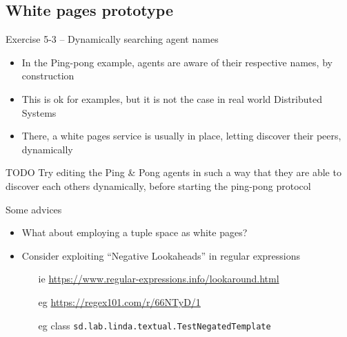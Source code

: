 \documentclass[presentation]{beamer}\mode<presentation>{\usetheme{AMSCesenaPurpleAndGold}}
\begin{document}
\subsection{White pages prototype}

\begin{frame}[allowframebreaks]{Exercise 5-3 -- Dynamically searching agent names}

\begin{itemize}
    \item In the Ping-pong example, agents are aware of their respective names, \alert{by construction}

    \vspace{.3cm}

    \item This is ok for examples, but \alert{it is not the case} in real world Distributed Systems

    \vspace{.3cm}

    \item There, a \alert{white pages} service is usually in place, letting \alert{discover} their peers, \alert{dynamically}

\end{itemize}

\vspace{.3cm}

\begin{block}{TODO}
    Try editing the Ping \& Pong agents in such a way that they are able to \alert{discover} each others dynamically, \alert{before} starting the ping-pong protocol
\end{block}

\framebreak

\begin{exampleblock}{Some advices}
    \begin{itemize}
        \item What about employing a \alert{tuple space} as white pages?

        \item Consider exploiting ``Negative Lookaheads'' in regular expressions
        \begin{itemize}
            \item[ie] \url{https://www.regular-expressions.info/lookaround.html}
            \item[eg] \url{https://regex101.com/r/66NTyD/1}
            \item[eg] class \texttt{sd.lab.linda.textual.\alert{TestNegatedTemplate}}
        \end{itemize}
    \end{itemize}
\end{exampleblock}

\end{frame}
\end{document}
